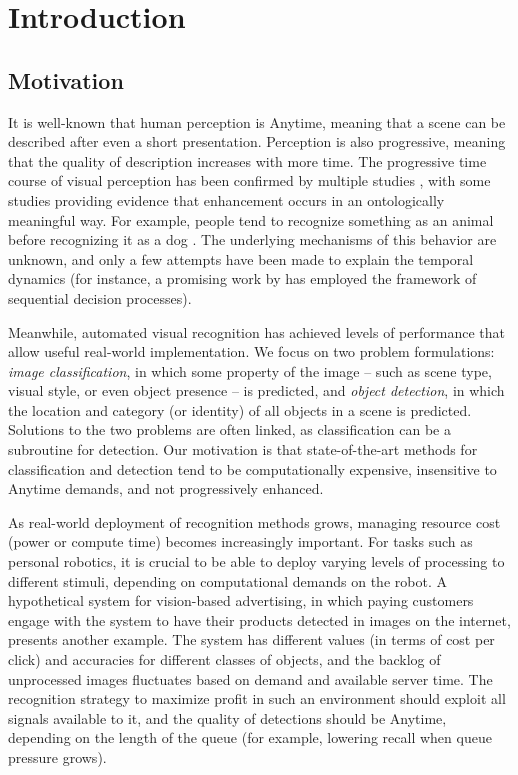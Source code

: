 \chapter{Introduction}\label{sec:introduction}

\section{Motivation}

It is well-known that human perception is Anytime, meaning that a scene can be described after even a short presentation.
Perception is also progressive, meaning that the quality of description increases with more time.
The progressive time course of visual perception has been confirmed by multiple studies \parencite{Vanrullen-1996,Fei-Fei-Vision-2007}, with some studies providing evidence that enhancement occurs in an ontologically meaningful way.
For example, people tend to recognize something as an animal before recognizing it as a dog \parencite{Mace-PloS-2009}.
The underlying mechanisms of this behavior are unknown, and only a few attempts have been made to explain the temporal dynamics (for instance, a promising work by \cite{Hegde-Neuro-2008} has employed the framework of sequential decision processes).

Meanwhile, automated visual recognition has achieved levels of performance that allow useful real-world implementation.
We focus on two problem formulations: \emph{image classification}, in which some property of the image -- such as scene type, visual style, or even object presence -- is predicted, and \emph{object detection}, in which the location and category (or identity) of all objects in a scene is predicted.
Solutions to the two problems are often linked, as classification can be a subroutine for detection.
Our motivation is that state-of-the-art methods for classification and detection tend to be computationally expensive, insensitive to Anytime demands, and not progressively enhanced.

As real-world deployment of recognition methods grows, managing resource cost (power or compute time) becomes increasingly important.
For tasks such as personal robotics, it is crucial to be able to deploy varying levels of processing to different stimuli, depending on computational demands on the robot.
A hypothetical system for vision-based advertising, in which paying customers engage with the system to have their products detected in images on the internet, presents another example.
The system has different values (in terms of cost per click) and accuracies for different classes of objects, and the backlog of unprocessed images fluctuates based on demand and available server time.
The recognition strategy to maximize profit in such an environment should exploit all signals available to it, and the quality of detections should be Anytime, depending on the length of the queue (for example, lowering recall when queue pressure grows).

